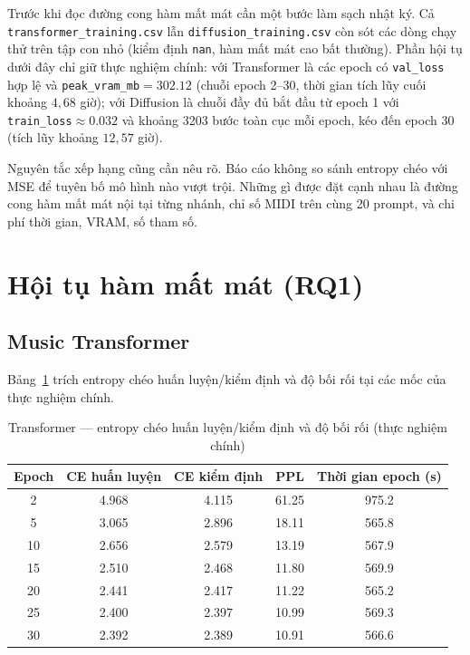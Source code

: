 Trước khi đọc đường cong hàm mất mát cần một bước làm sạch nhật ký. Cả \texttt{transformer\_training.csv} lẫn \texttt{diffusion\_training.csv} còn sót các dòng chạy thử trên tập con nhỏ (kiểm định \texttt{nan}, hàm mất mát cao bất thường). Phần hội tụ dưới đây chỉ giữ thực nghiệm chính: với Transformer là các epoch có \texttt{val\_loss} hợp lệ và \texttt{peak\_vram\_mb}${}=302.12$ (chuỗi epoch 2--30, thời gian tích lũy cuối khoảng $4{,}68$ giờ); với Diffusion là chuỗi đầy đủ bắt đầu từ epoch 1 với \texttt{train\_loss}${}\approx 0.032$ và khoảng 3203 bước toàn cục mỗi epoch, kéo đến epoch 30 (tích lũy khoảng $12{,}57$ giờ).

Nguyên tắc xếp hạng cũng cần nêu rõ. Báo cáo không so sánh entropy chéo với MSE để tuyên bố mô hình nào vượt trội. Những gì được đặt cạnh nhau là đường cong hàm mất mát nội tại từng nhánh, chỉ số MIDI trên cùng 20 prompt, và chi phí thời gian, VRAM, số tham số.

\section{Hội tụ hàm mất mát (RQ1)}
\label{sec:ch4-loss}

\subsection{Music Transformer}

Bảng~\ref{tab:ch4-tf-loss} trích entropy chéo huấn luyện/kiểm định và độ bối rối tại các mốc của thực nghiệm chính.

\begin{table}[htbp]
\centering
\caption{Transformer --- entropy chéo huấn luyện/kiểm định và độ bối rối (thực nghiệm chính)}
\label{tab:ch4-tf-loss}
\begin{tabular}{ccccc}
\toprule
Epoch & CE huấn luyện & CE kiểm định & PPL & Thời gian epoch (s) \\
\midrule
2 & 4.968 & 4.115 & 61.25 & 975.2 \\
5 & 3.065 & 2.896 & 18.11 & 565.8 \\
10 & 2.656 & 2.579 & 13.19 & 567.9 \\
15 & 2.510 & 2.468 & 11.80 & 569.9 \\
20 & 2.441 & 2.417 & 11.22 & 565.2 \\
25 & 2.400 & 2.397 & 10.99 & 569.3 \\
30 & 2.392 & 2.389 & 10.91 & 566.6 \\
\bottomrule
\end{tabular}
\end{table}

